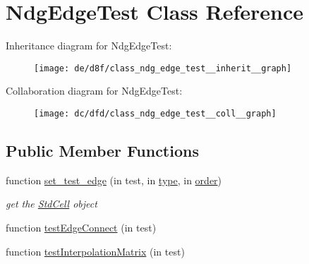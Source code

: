 \hypertarget{class_ndg_edge_test}{}\section{Ndg\+Edge\+Test Class Reference}
\label{class_ndg_edge_test}


Inheritance diagram for Ndg\+Edge\+Test\+:
\nopagebreak
\begin{figure}[H]
\begin{center}
\leavevmode
\texttt{[image: de/d8f/class\_ndg\_edge\_test\_\_inherit\_\_graph]}
\end{center}
\end{figure}


Collaboration diagram for Ndg\+Edge\+Test\+:
\nopagebreak
\begin{figure}[H]
\begin{center}
\leavevmode
\texttt{[image: dc/dfd/class\_ndg\_edge\_test\_\_coll\_\_graph]}
\end{center}
\end{figure}
\subsection*{Public Member Functions}
\begin{DoxyCompactItemize}
\item 
function \hyperlink{class_ndg_edge_test_afbd964fc333e315cda741b4c79b8445a}{set\+\_\+test\+\_\+edge} (in test, in \hyperlink{class_ndg_edge_test_a49d00a052d95265f17f599edb959706c}{type}, in \hyperlink{class_ndg_edge_test_ab3473b927738036503cf905cfceadf5e}{order})
\begin{DoxyCompactList}\small\item\em get the \hyperlink{class_std_cell}{Std\+Cell} object \end{DoxyCompactList}\item 
function \hyperlink{class_ndg_edge_test_a6e522f0f43b8982bfcf330e132bd8d99}{test\+Edge\+Connect} (in test)
\item 
function \hyperlink{class_ndg_edge_test_a3eae780af603a42173bfb67c38c7ca14}{test\+Interpolation\+Matrix} (in test)
\end{DoxyCompactItemize}
